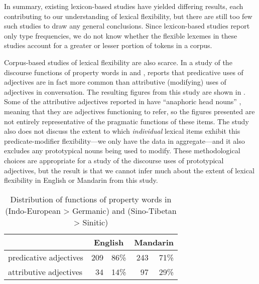 In summary, existing lexicon-based studies have yielded differing results, each contributing to our understanding of lexical flexibility, but there are still too few such studies to draw any general conclusions. Since lexicon-based studies report only type frequencies, we do not know whether the flexible lexemes in these studies account for a greater or lesser portion of tokens in a corpus.

Corpus-based studies of lexical flexibility are also scarce. In a study of the discourse functions of property words in  and , \textcite{Thompson1989} reports that predicative uses of adjectives are in fact more common than attributive (modifying) uses of adjectives in conversation. The resulting figures from this study are shown in . Some of the attributive adjectives reported in  have \enquote{anaphoric head nouns} \parencite[258]{Thompson1989}, meaning that they are adjectives functioning to refer, so the figures presented are not entirely representative of the pragmatic functions of these items. The study also does not discuss the extent to which \emph{individual} lexical items exhibit this predicate-modifier flexibility—we only have the data in aggregate—and it also excludes any prototypical nouns being used to modify. These methodological choices are appropriate for a study of the discourse uses of prototypical adjectives, but the result is that we cannot infer much about the extent of lexical flexibility in English or Mandarin from this study.

\begin{table}[h]
  \centering
  \caption[Distribution of functions of property words in English (Indo-European > Germanic) and Mandarin (Sino-Tibetan > Sinitic)]{Distribution of functions of property words in  (Indo-European > Germanic) and  (Sino-Tibetan > Sinitic) \parencite[253, 257]{Thompson1989}}
  \label{tab:Thompson-1989}
  \begin{tabular}{ l r r r r }
    \toprule
      {                    } & \multicolumn{2}{c}{English} & \multicolumn{2}{c}{Mandarin} \\
    \midrule
      predicative adjectives & 209 & 86\%                  & 243 & 71\% \\
      attributive adjectives &  34 & 14\%                  &  97 & 29\% \\
    \bottomrule
  \end{tabular}
\end{table}

